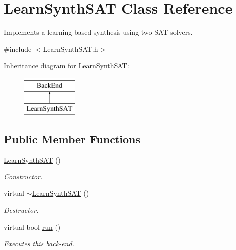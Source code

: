 \hypertarget{classLearnSynthSAT}{\section{Learn\-Synth\-S\-A\-T Class Reference}
\label{classLearnSynthSAT}
}


Implements a learning-\/based synthesis using two S\-A\-T solvers.  




{\ttfamily \#include $<$Learn\-Synth\-S\-A\-T.\-h$>$}

Inheritance diagram for Learn\-Synth\-S\-A\-T\-:\begin{figure}[H]
\begin{center}
\leavevmode
\includegraphics[height=2.000000cm]{classLearnSynthSAT}
\end{center}
\end{figure}
\subsection*{Public Member Functions}
\begin{DoxyCompactItemize}
\item 
\hyperlink{classLearnSynthSAT_a0d2a30dcdd8a601aaea8ddf689717bcc}{Learn\-Synth\-S\-A\-T} ()
\begin{DoxyCompactList}\small\item\em Constructor. \end{DoxyCompactList}\item 
virtual \hyperlink{classLearnSynthSAT_a2cb64f16d981276fe946d0fa0cf0bd09}{$\sim$\-Learn\-Synth\-S\-A\-T} ()
\begin{DoxyCompactList}\small\item\em Destructor. \end{DoxyCompactList}\item 
virtual bool \hyperlink{classLearnSynthSAT_a13a50b2649f44d37761fdbff26e9c0c0}{run} ()
\begin{DoxyCompactList}\small\item\em Executes this back-\/end. \end{DoxyCompactList}\end{DoxyCompactItemize}
